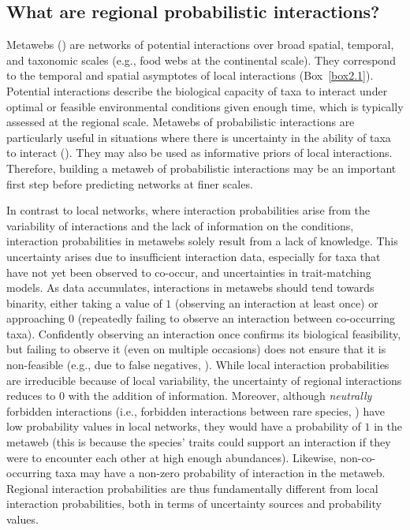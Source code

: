 \subsection{What are regional probabilistic interactions?}

Metawebs (\cite{Dunne2006Network}) are networks of potential interactions over
broad spatial, temporal, and taxonomic scales (e.g., food webs at the
continental scale). They correspond to the temporal and spatial asymptotes of
local interactions (Box~\ref{box2.1}). Potential interactions describe the biological
capacity of taxa to interact under optimal or feasible environmental conditions
given enough time, which is typically assessed at the regional scale. Metawebs
of probabilistic interactions are particularly useful in situations where there
is uncertainty in the ability of taxa to interact (\cite{Strydom2023Grapha}).
They may also be used as informative priors of local interactions. Therefore,
building a metaweb of probabilistic interactions may be an important first step
before predicting networks at finer scales. 

In contrast to local networks, where interaction probabilities arise from the
variability of interactions and the lack of information on the conditions,
interaction probabilities in metawebs solely result from a lack of knowledge.
This uncertainty arises due to insufficient interaction data, especially for
taxa that have not yet been observed to co-occur, and uncertainties in
trait-matching models. As data accumulates, interactions in metawebs should tend
towards binarity, either taking a value of $1$ (observing an interaction at
least once) or approaching $0$ (repeatedly failing to observe an interaction
between co-occurring taxa). Confidently observing an interaction once confirms
its biological feasibility, but failing to observe it (even on multiple
occasions) does not ensure that it is non-feasible (e.g., due to false
negatives, \cite{Catchen2023Missinga}). While local interaction probabilities
are irreducible because of local variability, the uncertainty of regional
interactions reduces to $0$ with the addition of information. Moreover, although
\textit{neutrally} forbidden interactions (i.e., forbidden interactions between
rare species, \cite{Canard2012Emergence}) have low probability values in local
networks, they would have a probability of $1$ in the metaweb (this is because
the species' traits could support an interaction if they were to encounter each
other at high enough abundances). Likewise, non-co-occurring taxa may have a
non-zero probability of interaction in the metaweb. Regional interaction
probabilities are thus fundamentally different from local interaction
probabilities, both in terms of uncertainty sources and probability values.

